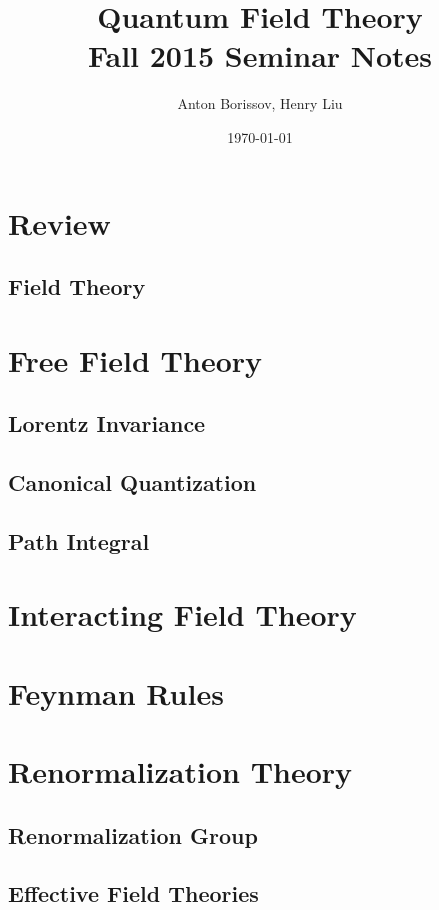 \documentclass{report}
\title{Quantum Field Theory\\Fall 2015 Seminar Notes}
\author{Anton Borissov, Henry Liu}
\date{\today}
\theoremstyle{plain}
\theoremstyle{definition}
\begin{document}
\maketitle

\chapter{Review}

\section{Field Theory}

\chapter{Free Field Theory}

\section{Lorentz Invariance}

\section{Canonical Quantization}

\section{Path Integral}

\chapter{Interacting Field Theory}

\chapter{Feynman Rules}

\chapter{Renormalization Theory}

\section{Renormalization Group}

\section{Effective Field Theories}
\end{document}
